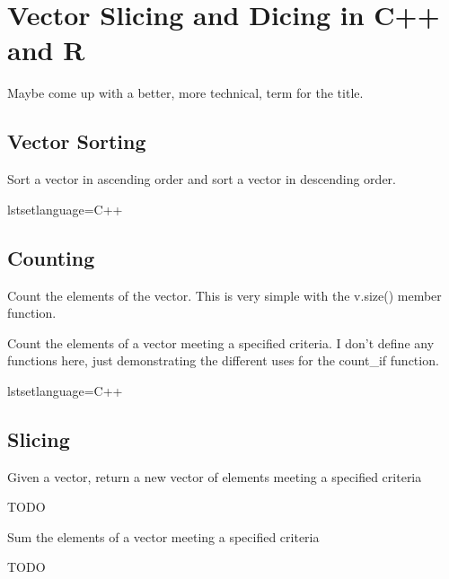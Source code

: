 \chapter{Vector Slicing and Dicing in C++ and R}
Maybe come up with a better, more technical, term for the title.

\section{Vector Sorting}
Sort a vector in ascending order and sort a vector in descending order.

lstset{language=C++}


\lstset{language=R}


\section{Counting}
Count the elements of the vector. This is very simple with the v.size() member function.


Count the elements of a vector meeting a specified criteria. I don't define any functions here, just demonstrating the different uses for the count\_if function.

lstset{language=C++}


\lstset{language=R}


\section{Slicing}
Given a vector, return a new vector of elements meeting a specified criteria

TODO


Sum the elements of a vector meeting a specified criteria


TODO